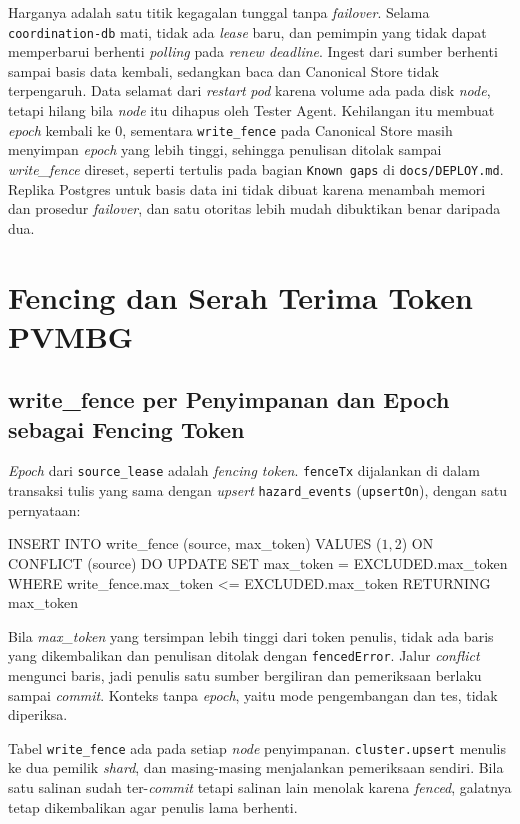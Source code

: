Harganya adalah satu titik kegagalan tunggal tanpa \textit{failover}. Selama \texttt{coordination-db} mati, tidak ada \textit{lease} baru, dan pemimpin yang tidak dapat memperbarui berhenti \textit{polling} pada \textit{renew deadline}. Ingest dari sumber berhenti sampai basis data kembali, sedangkan baca dan Canonical Store tidak terpengaruh. Data selamat dari \textit{restart} \textit{pod} karena volume ada pada disk \textit{node}, tetapi hilang bila \textit{node} itu dihapus oleh Tester Agent. Kehilangan itu membuat \textit{epoch} kembali ke 0, sementara \texttt{write\_fence} pada Canonical Store masih menyimpan \textit{epoch} yang lebih tinggi, sehingga penulisan ditolak sampai \textit{write\_fence} direset, seperti tertulis pada bagian \texttt{Known gaps} di \texttt{docs/DEPLOY.md}. Replika Postgres untuk basis data ini tidak dibuat karena menambah memori dan prosedur \textit{failover}, dan satu otoritas lebih mudah dibuktikan benar daripada dua.

\section{Fencing dan Serah Terima Token PVMBG}

\subsection{write\_fence per Penyimpanan dan Epoch sebagai Fencing Token}

\textit{Epoch} dari \texttt{source\_lease} adalah \textit{fencing token}. \texttt{fenceTx} dijalankan di dalam transaksi tulis yang sama dengan \textit{upsert} \texttt{hazard\_events} (\texttt{upsertOn}), dengan satu pernyataan:

\begin{codebox}
INSERT INTO write_fence (source, max_token) VALUES ($1, $2)
ON CONFLICT (source) DO UPDATE SET max_token = EXCLUDED.max_token
WHERE write_fence.max_token <= EXCLUDED.max_token
RETURNING max_token
\end{codebox}

Bila \textit{max\_token} yang tersimpan lebih tinggi dari token penulis, tidak ada baris yang dikembalikan dan penulisan ditolak dengan \texttt{fencedError}. Jalur \textit{conflict} mengunci baris, jadi penulis satu sumber bergiliran dan pemeriksaan berlaku sampai \textit{commit}. Konteks tanpa \textit{epoch}, yaitu mode pengembangan dan tes, tidak diperiksa.

Tabel \texttt{write\_fence} ada pada setiap \textit{node} penyimpanan. \texttt{cluster.upsert} menulis ke dua pemilik \textit{shard}, dan masing-masing menjalankan pemeriksaan sendiri. Bila satu salinan sudah ter-\textit{commit} tetapi salinan lain menolak karena \textit{fenced}, galatnya tetap dikembalikan agar penulis lama berhenti.


